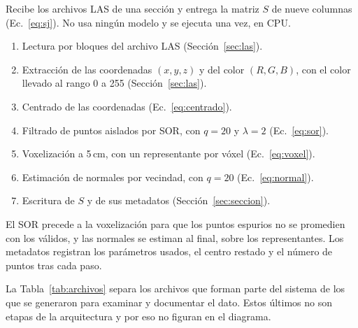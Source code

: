 Recibe los archivos LAS de una sección y entrega la matriz $S$ de nueve
columnas (Ec.~\eqref{eq:sj}). No usa ningún modelo y se ejecuta una vez, en CPU.
\begin{enumerate}\setlength{\itemsep}{1pt}
\item Lectura por bloques del archivo LAS (Sección~\ref{sec:las}).
\item Extracción de las coordenadas $(x,y,z)$ y del color $(R,G,B)$, con el
color llevado al rango 0 a 255 (Sección~\ref{sec:las}).
\item Centrado de las coordenadas (Ec.~\eqref{eq:centrado}).
\item Filtrado de puntos aislados por SOR, con $q=20$ y $\lambda=2$
(Ec.~\eqref{eq:sor}).
\item Voxelización a 5\,cm, con un representante por vóxel
(Ec.~\eqref{eq:voxel}).
\item Estimación de normales por vecindad, con $q=20$
(Ec.~\eqref{eq:normal}).
\item Escritura de $S$ y de sus metadatos (Sección~\ref{sec:seccion}).
\end{enumerate}
El SOR precede a la voxelización para que los puntos espurios no se promedien
con los válidos, y las normales se estiman al final, sobre los representantes.
Los metadatos registran los parámetros usados, el centro restado y el número de
puntos tras cada paso.

La Tabla~\ref{tab:archivos} separa los archivos que forman parte del sistema de
los que se generaron para examinar y documentar el dato. Estos últimos no son
etapas de la arquitectura y por eso no figuran en el diagrama.

